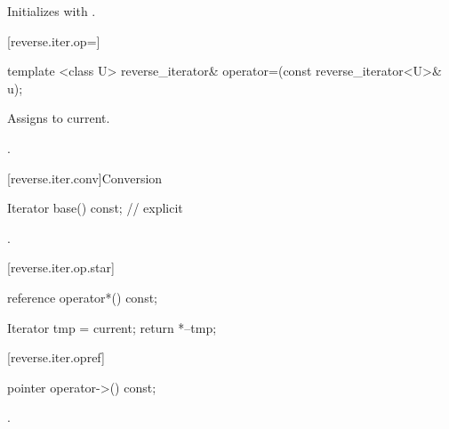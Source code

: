 \begin{itemdescr}
\pnum
\effects
Initializes
with
.
\end{itemdescr}

[reverse.iter.op=]{}

%
\begin{itemdecl}
template <class U>
reverse_iterator&
  operator=(const reverse_iterator<U>& u);
\end{itemdecl}

\begin{itemdescr}
\pnum
\effects
Assigns  to current.

\pnum
\returns
{}.
\end{itemdescr}

[reverse.iter.conv]{Conversion}

%
%
\begin{itemdecl}
Iterator base() const;          // explicit
\end{itemdecl}

\begin{itemdescr}
\pnum
\returns
{}.
\end{itemdescr}

[reverse.iter.op.star]{}

%
\begin{itemdecl}
reference operator*() const;
\end{itemdecl}

\begin{itemdescr}
\pnum
\effects
\begin{codeblock}
Iterator tmp = current;
return *--tmp;
\end{codeblock}

\end{itemdescr}

[reverse.iter.opref]{}

%
\begin{itemdecl}
pointer operator->() const;
\end{itemdecl}

\begin{itemdescr}
\pnum
\returns {}.
\end{itemdescr}

